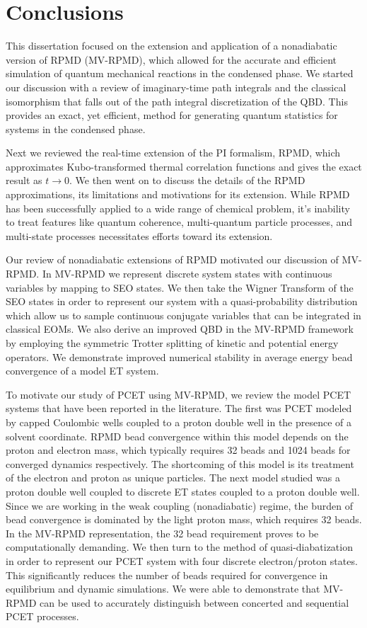 \documentclass[phd,tocprelim]{cornell}
\begin{document}
\chapter{Conclusions }
This dissertation focused on the extension and application of a nonadiabatic version of RPMD (MV-RPMD), which allowed for the accurate and efficient simulation of quantum mechanical reactions in the condensed phase. We started our discussion with a review of imaginary-time path integrals and the classical isomorphism that falls out of the path integral discretization of the QBD. This provides an exact, yet efficient, method for generating quantum statistics for systems in the condensed phase. 

Next we reviewed the real-time extension of the PI formalism, RPMD, which approximates Kubo-transformed thermal correlation functions and gives the exact result as $t\to0$. We then went on to discuss the details of the RPMD approximations, its limitations and motivations for its extension. While RPMD has been successfully applied to a wide range of chemical problem, it's inability to treat features like quantum coherence, multi-quantum particle processes, and multi-state processes necessitates efforts toward its extension. 


Our review of nonadiabatic extensions of RPMD motivated our discussion of MV-RPMD. In MV-RPMD we represent discrete system states with continuous variables by mapping to SEO states. We then take the Wigner Transform of the SEO states in order to represent our system with a quasi-probability distribution which allow us to sample continuous conjugate variables that can be integrated in classical EOMs. We also derive an improved QBD in the MV-RPMD framework by employing the symmetric Trotter splitting of kinetic and potential energy operators. We demonstrate improved numerical stability in average energy bead convergence of a model ET system. 


To motivate our study of PCET using MV-RPMD, we review the model PCET systems that have been reported in the literature. The first was PCET modeled by capped Coulombic wells coupled to a proton double well in the presence of a solvent coordinate. RPMD bead convergence within this model depends on the proton and electron mass, which typically requires 32 beads and 1024 beads for converged dynamics respectively. The shortcoming of this model is its treatment of the electron and proton as unique particles. The next model studied was a proton double well coupled to discrete ET states coupled to a proton double well. Since we are working in the weak coupling (nonadiabatic) regime, the burden of bead convergence is dominated by the light proton mass, which requires 32 beads. In the MV-RPMD representation, the 32 bead requirement proves to be computationally demanding. We then turn to the method of quasi-diabatization in order to represent our PCET system with four discrete electron/proton states. This significantly reduces the number of beads required for convergence in equilibrium and dynamic simulations. We were able to demonstrate that MV-RPMD can be used to accurately distinguish between concerted and sequential PCET processes. 
\end{document}
